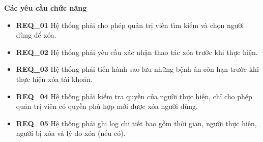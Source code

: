 \noindent \textbf{Các yêu cầu chức năng}

\begin{itemize}

    \item \textbf{REQ\_01} Hệ thống phải cho phép quản trị viên tìm kiếm và chọn người dùng để xóa.

    \item \textbf{REQ\_02} Hệ thống phải yêu cầu xác nhận thao tác xóa trước khi thực hiện. 
    
    \item \textbf{REQ\_03} Hệ thống phải tiến hành sao lưu những bệnh án còn hạn trước khi thực hiện xóa tài khoản.

    \item \textbf{REQ\_04} Hệ thống phải kiểm tra quyền của người thực hiện, chỉ cho phép quản trị viên có quyền phù hợp mới được xóa người dùng.

    \item \textbf{REQ\_05} Hệ thống phải ghi log chi tiết bao gồm thời gian, người thực hiện, người bị xóa và lý do xóa (nếu có).
\end{itemize}

